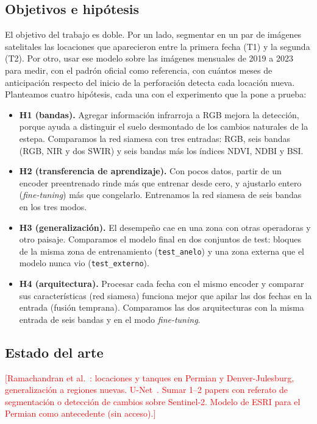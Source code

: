 \documentclass[10pt,a4paper]{article}
\newcommand{\pend}[1]{\textcolor{red}{[#1]}}
\begin{document}
\subsection{Objetivos e hipótesis}
El objetivo del trabajo es doble. Por un lado, segmentar en un par de imágenes satelitales las locaciones
que aparecieron entre la primera fecha (T1) y la segunda (T2). Por otro, usar ese modelo sobre las imágenes
mensuales de 2019 a 2023 para medir, con el padrón oficial como referencia, con cuántos meses de anticipación
respecto del inicio de la perforación detecta cada locación nueva. Planteamos cuatro hipótesis, cada una con el
experimento que la pone a prueba:
\begin{itemize}[leftmargin=*,itemsep=1pt]
  \item \textbf{H1 (bandas).} Agregar información infrarroja a RGB mejora la detección, porque ayuda a
  distinguir el suelo desmontado de los cambios naturales de la estepa. Comparamos la red siamesa con tres
  entradas: RGB, seis bandas (RGB, NIR y dos SWIR) y seis bandas más los índices NDVI, NDBI y BSI.
  \item \textbf{H2 (transferencia de aprendizaje).} Con pocos datos, partir de un encoder preentrenado rinde
  más que entrenar desde cero, y ajustarlo entero (\emph{fine-tuning}) más que congelarlo. Entrenamos la red
  siamesa de seis bandas en los tres modos.
  \item \textbf{H3 (generalización).} El desempeño cae en una zona con otras operadoras y otro paisaje.
  Comparamos el modelo final en dos conjuntos de test: bloques de la misma zona de entrenamiento
  (\texttt{test\_anelo}) y una zona externa que el modelo nunca vio (\texttt{test\_externo}).
  \item \textbf{H4 (arquitectura).} Procesar cada fecha con el mismo encoder y comparar sus características
  (red siamesa) funciona mejor que apilar las dos fechas en la entrada (fusión temprana). Comparamos las dos
  arquitecturas con la misma entrada de seis bandas y en el modo \emph{fine-tuning}.
\end{itemize}

\subsection{Estado del arte}
\pend{Ramachandran et al.~\cite{ramachandran2024}: locaciones y tanques en Permian y Denver-Julesburg, generalización a regiones nuevas.
U-Net~\cite{ronneberger2015}. Sumar 1--2 papers con referato de segmentación o detección de cambios sobre Sentinel-2.
Modelo de ESRI para el Permian como antecedente (sin acceso).}
\end{document}
